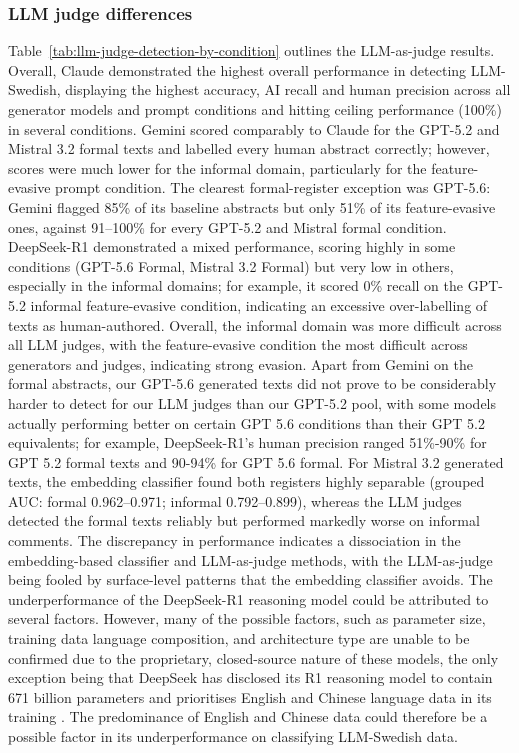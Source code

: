 \documentclass[thesis]{cluu}
\begin{document}
\subsubsection{LLM judge differences} Table~\ref{tab:llm-judge-detection-by-condition}  outlines the LLM-as-judge results. Overall, Claude demonstrated the highest overall performance in detecting LLM-Swedish, displaying the highest accuracy, AI recall and human precision across all generator models and prompt conditions and hitting ceiling performance (100\%) in several conditions. Gemini scored comparably to Claude for the GPT-5.2 and Mistral 3.2 formal texts and labelled every human abstract correctly; however, scores were much lower for the informal domain, particularly for the feature-evasive prompt condition. The clearest formal-register exception was GPT-5.6: Gemini flagged 85\% of its baseline abstracts but only 51\% of its feature-evasive ones, against 91--100\% for every GPT-5.2 and Mistral formal condition. DeepSeek-R1 demonstrated a mixed performance, scoring highly in some conditions (GPT-5.6 Formal, Mistral 3.2 Formal) but very low in others, especially in the informal domains; for example, it scored  0\% recall on the  GPT-5.2 informal feature-evasive condition, indicating an excessive over-labelling of texts as human-authored. Overall, the informal domain was more difficult across all LLM judges, with the feature-evasive condition the most difficult across generators and judges, indicating strong evasion. Apart from Gemini on the formal abstracts, our GPT-5.6 generated texts did not prove to be considerably harder to detect for our LLM judges than our GPT-5.2 pool, with some models actually performing better on certain GPT 5.6 conditions than their GPT 5.2 equivalents; for example, DeepSeek-R1's human precision ranged 51\%-90\% for GPT 5.2 formal texts and 90-94\% for GPT 5.6 formal. For Mistral 3.2 generated texts, the embedding classifier found both registers highly separable (grouped AUC: formal 0.962--0.971; informal 0.792--0.899), whereas the LLM judges detected the formal texts reliably but performed markedly worse on informal comments. The discrepancy in performance indicates a dissociation in the embedding-based classifier and LLM-as-judge methods, with the LLM-as-judge being fooled by surface-level patterns that the embedding classifier avoids. The underperformance of the DeepSeek-R1 reasoning model could be attributed to several factors. However, many of the possible factors, such as parameter size, training data language composition, and architecture type are unable to be confirmed due to the proprietary, closed-source nature of these models, the only exception being that DeepSeek has disclosed its R1 reasoning model to contain 671 billion parameters and prioritises English and Chinese language data in its training \parencite{Guo_2025}. The predominance of English and Chinese data could therefore be a possible factor in its underperformance on classifying LLM-Swedish data.
\end{document}
